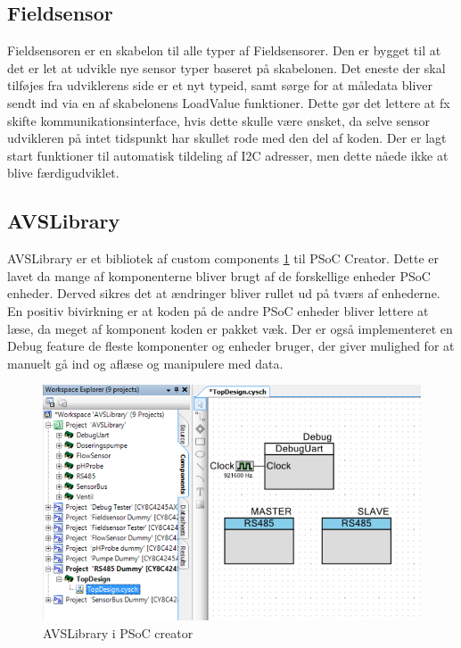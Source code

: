 \subsection{Fieldsensor}
Fieldsensoren er en skabelon til alle typer af Fieldsensorer. Den er bygget til at det er let at udvikle nye sensor typer baseret på skabelonen. Det eneste der skal tilføjes fra udviklerens side er et nyt typeid, samt sørge for at måledata bliver sendt ind via en af skabelonens LoadValue funktioner. Dette gør det lettere at fx skifte kommunikationsinterface, hvis dette skulle være ønsket, da selve sensor udvikleren på intet tidspunkt har skullet rode med den del af koden. Der er lagt start funktioner til automatisk tildeling af I2C adresser, men dette nåede ikke at blive færdigudviklet.

\subsection{AVSLibrary}
AVSLibrary er et bibliotek af custom components \ref{photo:AVSLibrary} til PSoC Creator. Dette er lavet da mange af komponenterne bliver brugt af de forskellige enheder PSoC enheder. Derved sikres det at ændringer bliver rullet ud på tværs af enhederne. En positiv bivirkning er at koden på de andre PSoC enheder bliver lettere at læse, da meget af komponent koden er pakket væk. Der er også implementeret en Debug feature de fleste komponenter og enheder bruger, der giver mulighed for at manuelt gå ind og aflæse og manipulere med data.

\begin{figure}[H]
	\centering 
	\includegraphics[scale=0.6]{Projektbeskrivelse/DesignOgImplementeringAfSW/AVSLibrary/AVSLibrary.png}
	\caption{AVSLibrary i PSoC creator}
	\label{photo:AVSLibrary}
\end{figure} 

